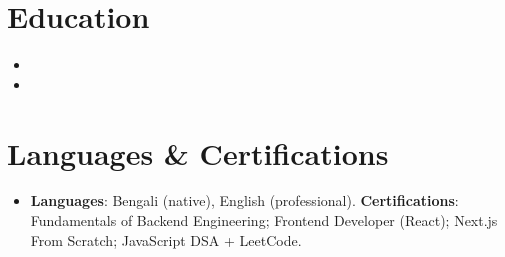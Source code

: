 \documentclass[11pt,a4paper,sans]{moderncv}
\begin{document}
\section{Education}
\vspace{1pt}
\begin{itemize}

\item{}

\item{}

\end{itemize}


\section{Languages \& Certifications}
\vspace{1pt}
\begin{itemize}
\item \textbf{Languages}: Bengali (native), English (professional). \textbf{Certifications}: Fundamentals of Backend Engineering; Frontend Developer (React); Next.js From Scratch; JavaScript DSA + LeetCode.
\end{itemize}
\end{document}
